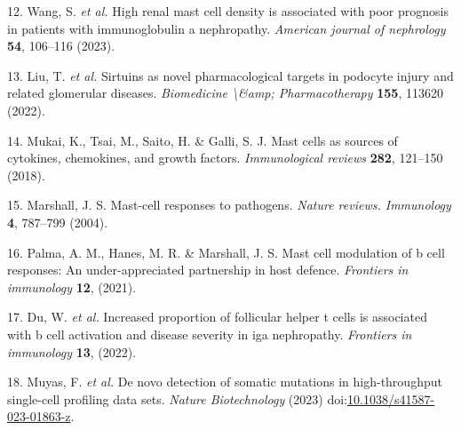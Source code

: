 \documentclass[
]{article}
\newenvironment{cslreferences}%
  {}%
  {\par}
\begin{document}
\begin{cslreferences}
\leavevmode\hypertarget{ref-HighRenalMastWang2023}{}%
12. Wang, S. \emph{et al.} High renal mast cell density is associated with poor prognosis in patients with immunoglobulin a nephropathy. \emph{American journal of nephrology} \textbf{54}, 106--116 (2023).

\leavevmode\hypertarget{ref-SirtuinsAsNovLiuT2022}{}%
13. Liu, T. \emph{et al.} Sirtuins as novel pharmacological targets in podocyte injury and related glomerular diseases. \emph{Biomedicine \textbackslash\&amp; Pharmacotherapy} \textbf{155}, 113620 (2022).

\leavevmode\hypertarget{ref-MastCellsAsSMukai2018}{}%
14. Mukai, K., Tsai, M., Saito, H. \& Galli, S. J. Mast cells as sources of cytokines, chemokines, and growth factors. \emph{Immunological reviews} \textbf{282}, 121--150 (2018).

\leavevmode\hypertarget{ref-MastCellRespoMarsha2004}{}%
15. Marshall, J. S. Mast-cell responses to pathogens. \emph{Nature reviews. Immunology} \textbf{4}, 787--799 (2004).

\leavevmode\hypertarget{ref-MastCellModulPalma2021}{}%
16. Palma, A. M., Hanes, M. R. \& Marshall, J. S. Mast cell modulation of b cell responses: An under-appreciated partnership in host defence. \emph{Frontiers in immunology} \textbf{12}, (2021).

\leavevmode\hypertarget{ref-IncreasedPropoDuWa2022}{}%
17. Du, W. \emph{et al.} Increased proportion of follicular helper t cells is associated with b cell activation and disease severity in iga nephropathy. \emph{Frontiers in immunology} \textbf{13}, (2022).

\leavevmode\hypertarget{ref-DeNovoDetectiMuyas2023}{}%
18. Muyas, F. \emph{et al.} De novo detection of somatic mutations in high-throughput single-cell profiling data sets. \emph{Nature Biotechnology} (2023) doi:\href{https://doi.org/10.1038/s41587-023-01863-z}{10.1038/s41587-023-01863-z}.
\end{cslreferences}
\end{document}

